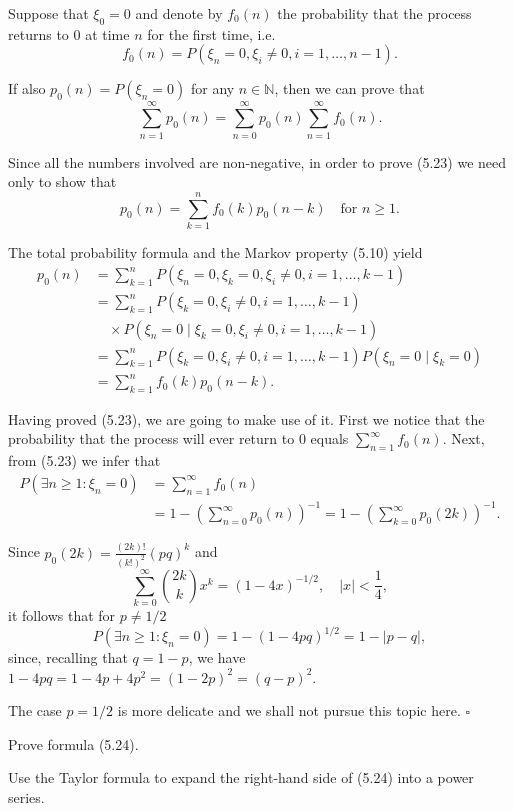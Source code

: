 \begin{Proof}
Suppose that $\xi_0 = 0$ and denote by $f_0(n)$ the probability that the process returns to $0$ at time $n$ for the first time, i.e.
\[
f_0(n) = P(\xi_n = 0, \xi_i \neq 0, i = 1, \dots, n-1).
\]

If also $p_0(n) = P(\xi_n = 0)$ for any $n \in \mathbb{N}$, then we can prove that
\[
\sum_{n=1}^\infty p_0(n) = \sum_{n=0}^\infty p_0(n) \sum_{n=1}^\infty f_0(n). \tag{5.23}
\]

Since all the numbers involved are non-negative, in order to prove (5.23) we need only to show that
\[
p_0(n) = \sum_{k=1}^n f_0(k) p_0(n-k) \quad \text{for } n \geq 1.
\]

The total probability formula and the Markov property (5.10) yield
\[
\begin{aligned}
p_0(n) &= \sum_{k=1}^n P(\xi_n = 0, \xi_k = 0, \xi_i \neq 0, i = 1, \dots, k-1) \\
&= \sum_{k=1}^n P(\xi_k = 0, \xi_i \neq 0, i = 1, \dots, k-1) \\
&\quad \times P(\xi_n = 0 \mid \xi_k = 0, \xi_i \neq 0, i = 1, \dots, k-1) \\
&= \sum_{k=1}^n P(\xi_k = 0, \xi_i \neq 0, i = 1, \dots, k-1) P(\xi_n = 0 \mid \xi_k = 0) \\
&= \sum_{k=1}^n f_0(k) p_0(n-k).
\end{aligned}
\]

Having proved (5.23), we are going to make use of it. First we notice that the probability that the process will ever return to $0$ equals $\sum_{n=1}^\infty f_0(n)$. Next, from (5.23) we infer that
\[
\begin{aligned}
P(\exists n \geq 1: \xi_n = 0) &= \sum_{n=1}^\infty f_0(n) \\
&= 1 - \left(\sum_{n=0}^\infty p_0(n)\right)^{-1} = 1 - \left(\sum_{k=0}^\infty p_0(2k)\right)^{-1}.
\end{aligned}
\]

Since $p_0(2k) = \frac{(2k)!}{(k!)^2} (pq)^k$ and
\[
\sum_{k=0}^\infty \binom{2k}{k} x^k = (1-4x)^{-1/2}, \quad |x| < \frac{1}{4}, \tag{5.24}
\]
it follows that for $p \neq 1/2$
\[
P(\exists n \geq 1: \xi_n = 0) = 1 - (1-4pq)^{1/2} = 1 - |p - q|, \tag{5.25}
\]
since, recalling that $q = 1-p$, we have $1-4pq = 1-4p+4p^2 = (1-2p)^2 = (q-p)^2$.

The case $p = 1/2$ is more delicate and we shall not pursue this topic here. $\square$
\end{Proof}

\begin{Exercise}
\label{exr:binomial-series}
Prove formula (5.24).

\begin{hint}
Use the Taylor formula to expand the right-hand side of (5.24) into a power series.
\end{hint}
\end{Exercise}

